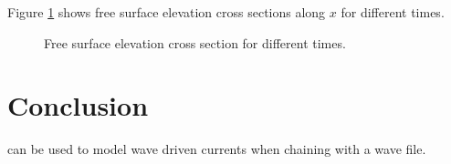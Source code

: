 Figure \ref{t2d:bj78:FreeSurfSection} shows free surface elevation cross sections
along $x$ for different times.

\begin{figure}[H]
  \centering
  \caption{Free surface elevation cross section for different times.}
  \label{t2d:bj78:FreeSurfSection}
\end{figure}

\section{Conclusion}

 can be used to model wave driven currents when chaining
with a wave file.
